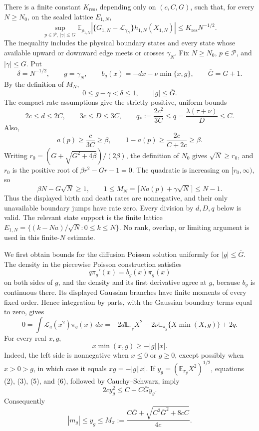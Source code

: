 There is a finite constant \(K_{\mathrm{res}}\), depending only on \((c,C,G)\), such that, for every \(N\geq N_0\), on the scaled lattice \(E_{1,N}\),
\[
 \sup_{p\in\mathcal P,\,|\gamma|\leq G}
 \mathbb E_{\rho_{1,N}}
 \left|\{G_{1,N}-\mathcal L_{\gamma_N}\}
 h_{1,N}(X_{1,N})\right|
 \leq K_{\mathrm{res}}N^{-1/2}.
\]
The inequality includes the physical boundary states and every state whose available upward or downward edge meets or crosses \(\gamma_N\).
Fix \(N\geq N_0\), \(p\in\mathcal P\), and \(|\gamma|\leq G\).  Put
\[
 \delta=N^{-1/2},\qquad g=\gamma_N,
 \qquad b_g(x)=-dx-\nu\min\{x,g\},
 \qquad \overline G=G+1.
 \tag{1}
\]
By the definition of \(M_N\),
\[
 0\leq g-\gamma<\delta\leq1,
 \qquad |g|\leq\overline G.
 \tag{2}
\]
The compact rate assumptions give the strictly positive, uniform bounds
\[
 2c\leq d\leq2C,\qquad 3c\leq D\leq3C,\qquad
 q_*:=\frac{2c^2}{3C}\leq q=\frac{\lambda(\tau+\nu)}D\leq C.
 \tag{3}
\]
Also,
\[
 a(p)\geq\frac{c}{3C}\geq\beta,
 \qquad 1-a(p)\geq\frac{2c}{C+2c}\geq\beta.
\]
Writing \(r_0=(G+\sqrt{G^2+4\beta})/(2\beta)\), the definition of \(N_0\) gives \(\sqrt N\geq r_0\), and \(r_0\) is the positive root of \(\beta r^2-Gr-1=0\).  The quadratic is increasing on \([r_0,\infty)\), so
\[
 \beta N-G\sqrt N\geq1,
 \qquad
 1\leq M_N=\lceil Na(p)+\gamma\sqrt N\rceil\leq N-1.
\]
Thus the displayed birth and death rates are nonnegative, and their only unavailable boundary jumps have rate zero.  Every division by \(d,D,q\) below is valid.  The relevant state support is the finite lattice \(E_{1,N}=\{(k-Na)/\sqrt N:0\leq k\leq N\}\).  No rank, overlap, or limiting argument is used in this finite-\(N\) estimate.

We first obtain bounds for the diffusion Poisson solution uniformly for \(|g|\leq\overline G\).  The density in the piecewise Poisson construction satisfies
\[
 q\pi_g'(x)=b_g(x)\pi_g(x)
 \tag{4}
\]
on both sides of \(g\), and the density and its first derivative agree at \(g\), because \(b_g\) is continuous there.  Its displayed Gaussian branches have finite moments of every fixed order.  Hence integration by parts, with the Gaussian boundary terms equal to zero, gives
\[
 0=\int \mathcal L_g(x^2)\pi_g(x)\,dx
   =-2d\mathbb E_{\pi_g}X^2
     -2\nu\mathbb E_{\pi_g}\{X\min(X,g)\}+2q.
 \tag{5}
\]
For every real \(x,g\),
\[
 x\min(x,g)\geq-|g|\,|x|.
 \tag{6}
\]
Indeed, the left side is nonnegative when \(x\leq0\) or \(g\geq0\), except possibly when \(x>0>g\), in which case it equals \(xg=-|g||x|\).  If \(y_g=(\mathbb E_{\pi_g}X^2)^{1/2}\), equations (2), (3), (5), and (6), followed by Cauchy--Schwarz, imply
\[
 2c y_g^2\leq C+C\overline G y_g.
 \tag{7}
\]
Consequently
\[
 |m_g|\leq y_g\leq
 M_\pi:=\frac{C\overline G+\sqrt{C^2\overline G^2+8cC}}{4c}.
 \tag{8}
\]

